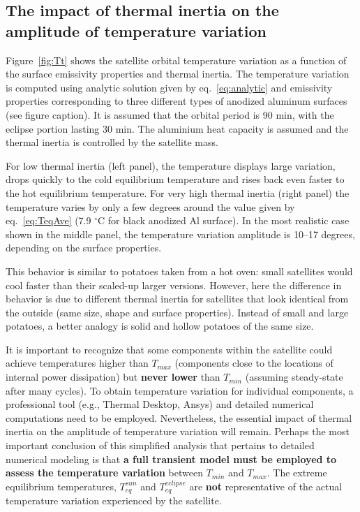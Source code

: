 \documentclass[]{aastex62}
\begin{document}
\newpage
\subsection{The impact of thermal inertia on the amplitude of temperature variation} 

Figure~\ref{fig:Tt} shows the satellite orbital temperature variation as a function of the surface emissivity
properties and thermal inertia. The temperature variation is computed using analytic solution given by
eq.~\ref{eq:analytic} and emissivity properties corresponding to three different types of anodized aluminum 
surfaces (see figure caption). It is assumed that the orbital period is 90 min, with the eclipse portion lasting 
30 min. The aluminium heat capacity is assumed and the thermal inertia is controlled by the satellite mass. 

For low thermal inertia (left panel), the temperature displays large variation, drops quickly to the cold 
equilibrium temperature and rises back even faster to the hot equilibrium temperature. For very high
thermal inertia (right panel) the temperature varies by only a few degrees around the value given by 
eq.~\ref{eq:TeqAve} (7.9 $^\circ$C for black anodized Al surface). In the most realistic case shown in the 
middle panel, the temperature variation amplitude is 10--17 degrees, depending on the surface properties. 

This behavior is similar to potatoes taken from a hot oven: small satellites would cool faster 
than their scaled-up larger versions. However, here the difference in behavior is due to different 
thermal inertia for satellites that look identical from the outside (same size, shape and surface properties). 
Instead of small and large potatoes, a better analogy is solid and hollow potatoes of the same size.

It is important to recognize that some components within the satellite could achieve temperatures 
higher than $T_{max}$ (components close to the locations of internal power dissipation) but {\bf never
lower} than $T_{min}$  (assuming steady-state after many cycles). To obtain temperature variation for 
individual components, a professional tool (e.g., Thermal Desktop, Ansys) and detailed numerical 
computations need to be employed. Nevertheless, the essential impact of thermal inertia on the 
amplitude of temperature variation will remain. Perhaps the most important conclusion of this 
simplified analysis that pertains to detailed numerical modeling is that {\bf a full transient model
must be employed to assess the temperature variation} between $T_{min}$ and $T_{max}$. The 
extreme equilibrium temperatures, $T_{eq}^{sun}$ and $T_{eq}^{eclipse}$ are {\bf not} representative of the
actual temperature variation experienced by the satellite. 
\end{document}
